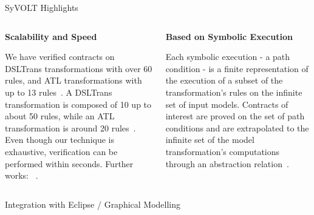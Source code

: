 \documentclass[final,hyperref={pdfpagelabels=false}]{beamer}
\begin{document}
\begin{frame}{}
\begin{block}{SyVOLT Highlights}
\begin{columns}[t,totalwidth=\linewidth]
            
            \begin{column}{.19\linewidth}
         \footnotesize
                   \begin{center}\textbf{Scalability and Speed}\end{center}
                   \footnotesize
            We have verified contracts on DSLTrans transformations with over 60
            rules, and ATL transformations with up to 13 rules~\cite{Oakes}. A DSLTrans transformation
            is composed of 10 up to about 50 rules, while an
            ATL transformation is around 20 rules~\cite{wimmer13}. Even though
            our technique is exhaustive, verification can be performed within seconds. Further works: ~\cite{Selim2015, Selim2014}.
            \end{column}
            \hspace{-1.2cm}\vrule\hspace{.05cm}
            \begin{column}{.18\linewidth}
                        \footnotesize
                      \begin{center}\textbf{Based on Symbolic Execution}\end{center}
                      \footnotesize
                        Each symbolic execution - a path condition - is a
                        finite representation of the execution of a subset of the transformation's
                        rules on the infinite set of input models. 
                        Contracts of interest are proved on the set of path conditions
                        and are extrapolated to the
                        infinite set of the model transformation's computations through
                        an abstraction relation~\cite{Lucio2014}.
                        \end{column}
                        
                  \end{columns}
                  
                  \vspace{-0.9cm}
            \end{block}
	\vspace{-0.2cm}
        \begin{block}{Integration with Eclipse / Graphical Modelling}
        \vspace{-2cm}
        \begin{columns}[t,totalwidth=\linewidth]
         \begin{column}{.585\linewidth}
         \vspace{-1.4cm}
         \small
       \begin{center}\textbf{~}\end{center}
       \footnotesize
                  

\end{column}
\end{columns}
\end{block}
\end{frame}
\end{document}
